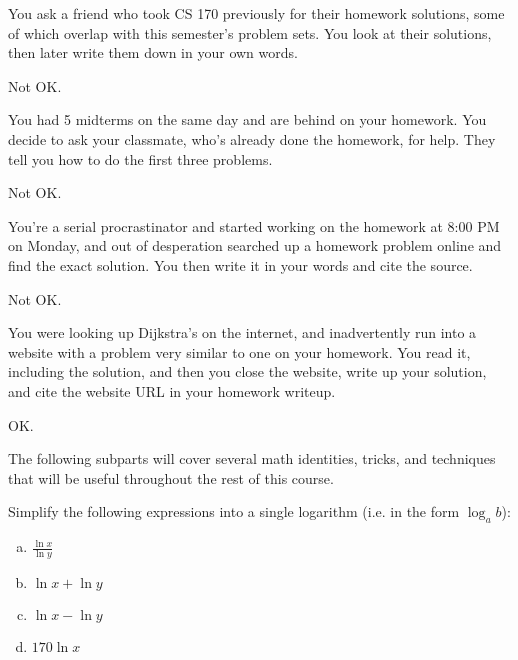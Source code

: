 \documentclass[11pt]{article}
\begin{document}
\begin{subparts}
    \subpart You ask a friend who took CS 170 previously for their homework solutions, 
    some of which overlap with this semester's problem sets. 
    You look at their solutions, then later write them down in your own words.

    \begin{solution}
        Not OK.
    \end{solution}

    \subpart You had 5 midterms on the same day and are behind on your homework. 
    You decide to ask your classmate, who's already done the homework, for help. 
    They tell you how to do the first three problems.

    \begin{solution}
        Not OK.
    \end{solution}

    \subpart You're a serial procrastinator and started working on the homework at 8:00 PM on Monday, and out of desperation searched up a homework problem online and find the exact solution. 
    You then write it in your words and cite the source.

    \begin{solution}
        Not OK.
    \end{solution}

    \subpart You were looking up Dijkstra's on the internet, and inadvertently run into a website with a problem very similar to one on your homework. 
    You read it, including the solution, and then you close the website, 
    write up your solution, and cite the website URL in your homework writeup.

    \begin{solution}
        OK.
    \end{solution}
\end{subparts}


\newpage
{}

The following subparts will cover several math identities, tricks, and techniques that will be useful throughout the rest of this course.

Simplify the following expressions into a single logarithm (i.e. in the form $\log_a b$):
\begin{enumerate}[(a)]

    \item $\frac{\ln x}{\ln y}$ 

    \item $\ln x + \ln y$

    \item $\ln x - \ln y$

    \item $170 \ln x$ 

\end{enumerate}
\end{document}
